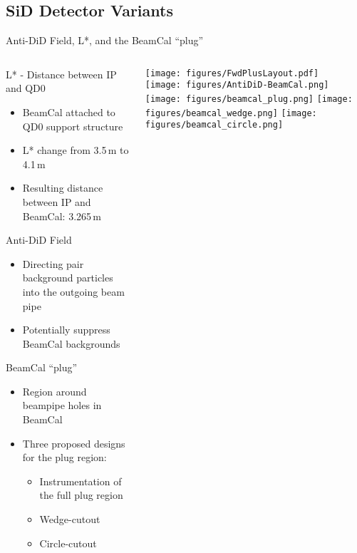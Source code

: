 \documentclass[xcolor={dvipsnames}]{beamer}
\begin{document}

\subsection{SiD Detector Variants}
\begin{frame}{Anti-DiD Field, L*, and the BeamCal ``plug''}
\begin{columns}
 \begin{column}{0.7\textwidth}
 \alert{L* - Distance between IP and QD0}
  \begin{itemize}
  \item BeamCal attached to QD0 support structure
  \item L* change from 3.5\,m to 4.1\,m
  \item Resulting distance between IP and BeamCal: 3.265\,m
 \end{itemize}
 \alert{Anti-DiD Field}
 \begin{itemize}
  \item Directing pair background particles into the outgoing beam pipe
  \item Potentially suppress BeamCal backgrounds
 \end{itemize}
 \alert{BeamCal ``plug''}
  \begin{itemize}
  \item Region around beampipe holes in BeamCal
  \item Three proposed designs for the plug region:
  \begin{itemize}
   \item Instrumentation of the full plug region
   \item Wedge-cutout
   \item Circle-cutout
  \end{itemize}
 \end{itemize}  
 \end{column}
 \begin{column}{0.35\textwidth}
  \texttt{[image: figures/FwdPlusLayout.pdf]}\\
  \vspace*{0.5cm}
  \texttt{[image: figures/AntiDiD-BeamCal.png]}\\
  \vspace*{0.5cm}
  \texttt{[image: figures/beamcal\_plug.png]}
  \texttt{[image: figures/beamcal\_wedge.png]}
  \texttt{[image: figures/beamcal\_circle.png]}
 \end{column}
\end{columns}

\end{frame}
\end{document}
